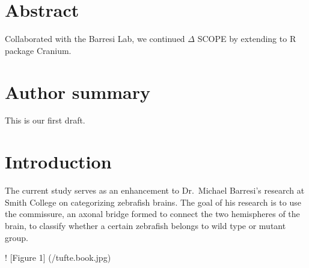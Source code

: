 \documentclass[10pt,letterpaper]{article}
\newcommand{\getIndex}[2]{
  \ForEach{,}{\IfEq{#1}{\thislevelitem}{\number\thislevelcount\ExitForEach}{}}{#2}
}
\newcommand{\getAff}[1]{
  \getIndex{#1}{}
}
\begin{document}
\vspace*{0.2in}

\section*{Abstract}
Collaborated with the Barresi Lab, we continued \(\Delta\) SCOPE by
extending to R package Cranium.

\section*{Author summary}
This is our first draft.

\linenumbers

\hypertarget{introduction}{%
\section{Introduction}\label{introduction}}

The current study serves as an enhancement to Dr.~Michael Barresi's
research at Smith College on categorizing zebrafish brains. The goal of
his research is to use the commissure, an axonal bridge formed to
connect the two hemispheres of the brain, to classify whether a certain
zebrafish belongs to wild type or mutant group.

! {[}Figure 1{]} (/tufte.book.jpg)
\end{document}
